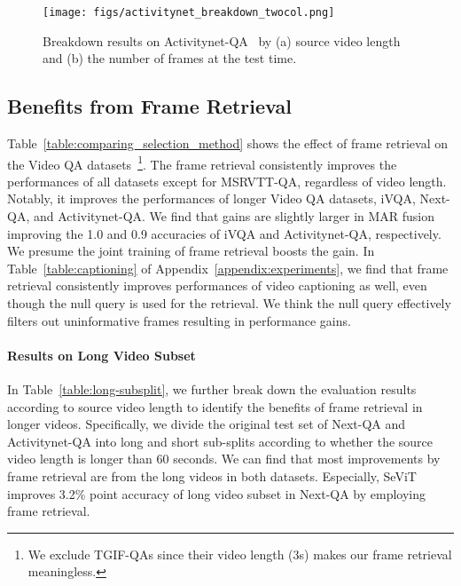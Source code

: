 \documentclass{article}
\newcommand{\frameworkname}{SeViT}
\begin{document}
\begin{figure*}[t!] 
\centering
\texttt{[image: figs/activitynet\_breakdown\_twocol.png]}
\caption{Breakdown results on Activitynet-QA~\cite{yu2019activitynet} by (a) source video length and (b) the number of frames at the test time.}
\label{fig:activitynet}
\end{figure*} 
\subsection{Benefits from Frame Retrieval}


Table~\ref{table:comparing_selection_method} shows the effect of frame retrieval on the Video QA datasets~\footnote{We exclude TGIF-QAs since their video length (3s) makes our frame retrieval meaningless.}. The frame retrieval consistently improves the performances of all datasets except for MSRVTT-QA, regardless of video length. Notably, it improves the performances of longer Video QA datasets, iVQA, Next-QA, and Activitynet-QA. We find that gains are slightly larger in MAR fusion improving the 1.0 and 0.9 accuracies of iVQA and Activitynet-QA, respectively. We presume the joint training of frame retrieval boosts the gain. In Table~\ref{table:captioning} of Appendix~\ref{appendix:experiments}, we find that frame retrieval consistently improves performances of video captioning as well, even though the null query is used for the retrieval. We think the null query effectively filters out uninformative frames resulting in performance gains.

\paragraph{Results on Long Video Subset}


In Table~\ref{table:long-subsplit}, we further break down the evaluation results according to source video length to identify the benefits of frame retrieval in longer videos. Specifically, we divide the original test set of Next-QA and Activitynet-QA into long and short sub-splits according to whether the source video length is longer than 60 seconds. We can find that most improvements by frame retrieval are from the long videos in both datasets. Especially, \frameworkname{} improves 3.2\% point accuracy of long video subset in Next-QA by employing frame retrieval.
\end{document}
